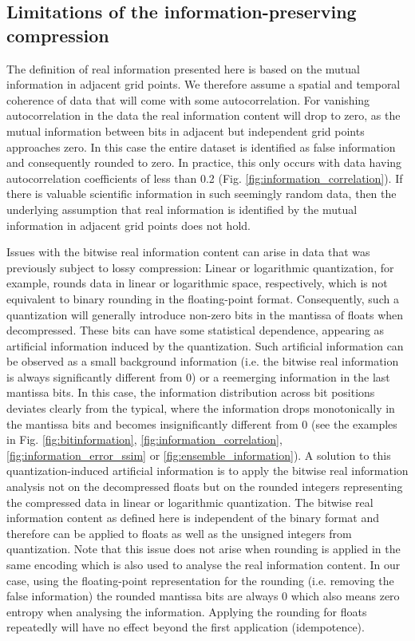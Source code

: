 \subsection{Limitations of the information-preserving compression}

The definition of real information presented here is based on the mutual information in adjacent grid points.
We therefore assume a spatial and temporal coherence of data that will come with some autocorrelation.
For vanishing autocorrelation in the data the real information content will drop to zero, as the mutual information
between bits in adjacent but independent grid points approaches zero. In this case the entire dataset is identified
as false information and consequently rounded to zero. In practice, this only occurs with data having autocorrelation
coefficients of less than 0.2 (Fig. \ref{fig:information_correlation}). If there is valuable scientific information in such
seemingly random data, then the underlying assumption that real information is identified by the mutual information
in adjacent grid points does not hold. 

Issues with the bitwise real information content can arise in data that was previously subject to lossy compression:
Linear or logarithmic quantization, for example, rounds data in linear or logarithmic space, respectively, which is not
equivalent to binary rounding in the floating-point format. Consequently, such a quantization will generally introduce
non-zero bits in the mantissa of floats when decompressed. These bits can have some statistical dependence,
appearing as artificial information induced by the quantization. Such artificial information can be observed as a
small background information (i.e. the bitwise real information is always significantly different from 0) or a reemerging
information in the last mantissa bits. In this case, the information distribution across bit positions deviates clearly from
the typical, where the information drops monotonically in the mantissa bits and becomes insignificantly different from
0 (see the examples in Fig. \ref{fig:bitinformation}, \ref{fig:information_correlation}, \ref{fig:information_error_ssim} or
\ref{fig:ensemble_information}). A solution to this quantization-induced artificial information is to apply the bitwise real
information analysis not on the decompressed floats but on the rounded integers representing the compressed data
in linear or logarithmic quantization. The bitwise real information content as defined here is independent of the binary
format and therefore can be applied to floats as well as the unsigned integers from quantization. Note that this issue
does not arise when rounding is applied in the same encoding which is also used to analyse the real information content.
In our case, using the floating-point representation for the rounding (i.e. removing the false information) the rounded
mantissa bits are always 0 which also means zero entropy when analysing the information. Applying the rounding for
floats repeatedly will have no effect beyond the first application (idempotence).

